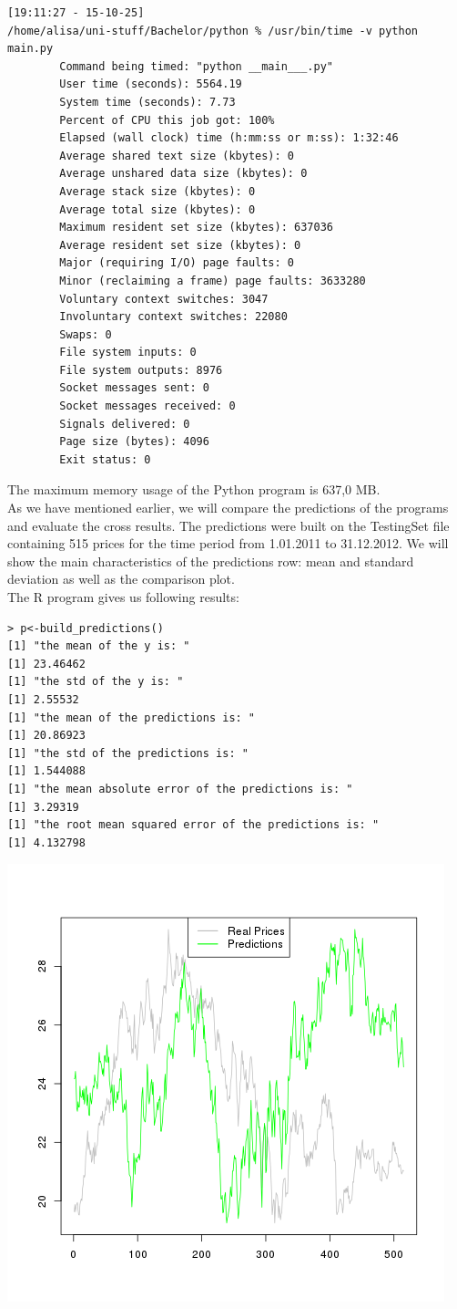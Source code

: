 \documentclass [twoside,
  11pt, a4paper,
  footinclude=true,
  headinclude=true,
  cleardoublepage=empty
]{article}
\begin{document}
\begin{verbatim}
[19:11:27 - 15-10-25] 
/home/alisa/uni-stuff/Bachelor/python % /usr/bin/time -v python main.py
        Command being timed: "python __main___.py"
        User time (seconds): 5564.19
        System time (seconds): 7.73
        Percent of CPU this job got: 100%
        Elapsed (wall clock) time (h:mm:ss or m:ss): 1:32:46
        Average shared text size (kbytes): 0
        Average unshared data size (kbytes): 0
        Average stack size (kbytes): 0
        Average total size (kbytes): 0
        Maximum resident set size (kbytes): 637036
        Average resident set size (kbytes): 0
        Major (requiring I/O) page faults: 0
        Minor (reclaiming a frame) page faults: 3633280
        Voluntary context switches: 3047
        Involuntary context switches: 22080
        Swaps: 0
        File system inputs: 0
        File system outputs: 8976
        Socket messages sent: 0
        Socket messages received: 0
        Signals delivered: 0
        Page size (bytes): 4096
        Exit status: 0
\end{verbatim}
The maximum memory usage of the Python program is 637,0 MB.\\
As we have mentioned earlier, we will compare the predictions of the programs and evaluate the cross results. The predictions were built on the TestingSet file containing 515 prices for the time period from 1.01.2011 to 31.12.2012. We will show the main characteristics of the predictions row: mean and standard deviation as well as the comparison plot.\\
The R program gives us following results:
\begin{verbatim}
> p<-build_predictions()
[1] "the mean of the y is: "
[1] 23.46462
[1] "the std of the y is: "
[1] 2.55532
[1] "the mean of the predictions is: "
[1] 20.86923
[1] "the std of the predictions is: "
[1] 1.544088
[1] "the mean absolute error of the predictions is: "
[1] 3.29319
[1] "the root mean squared error of the predictions is: "
[1] 4.132798
\end{verbatim}
\includegraphics[scale=0.75]{img_examples/RPredicitions.png}
\end{document}
